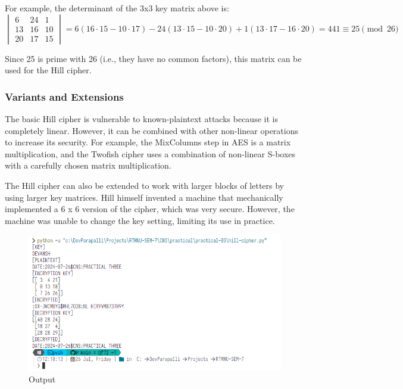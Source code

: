 \documentclass[12pt,a4paper]{article}
\begin{document}
For example, the determinant of the 3x3 key matrix above is:
\[
\begin{vmatrix}
6 & 24 & 1 \\
13 & 16 & 10 \\
20 & 17 & 15
\end{vmatrix}
= 6(16 \cdot 15 - 10 \cdot 17) - 24(13 \cdot 15 - 10 \cdot 20) + 1(13 \cdot 17 - 16 \cdot 20) = 441 \equiv 25 \pmod {26}
\]

Since 25 is prime with 26 (i.e., they have no common factors), this matrix can be used for the Hill cipher.

\subsubsection*{Variants and Extensions}

The basic Hill cipher is vulnerable to known-plaintext attacks because it is completely linear. However, it can be combined with other non-linear operations to increase its security. For example, the MixColumns step in AES is a matrix multiplication, and the Twofish cipher uses a combination of non-linear S-boxes with a carefully chosen matrix multiplication.

The Hill cipher can also be extended to work with larger blocks of letters by using larger key matrices. Hill himself invented a machine that mechanically implemented a 6 x 6 version of the cipher, which was very secure. However, the machine was unable to change the key setting, limiting its use in practice.

\newpage



\newpage

\begin{figure}[h]
    \caption{Output}
    \centering
    \includegraphics[width=\textwidth]{output.png}
\end{figure}


\end{document}
